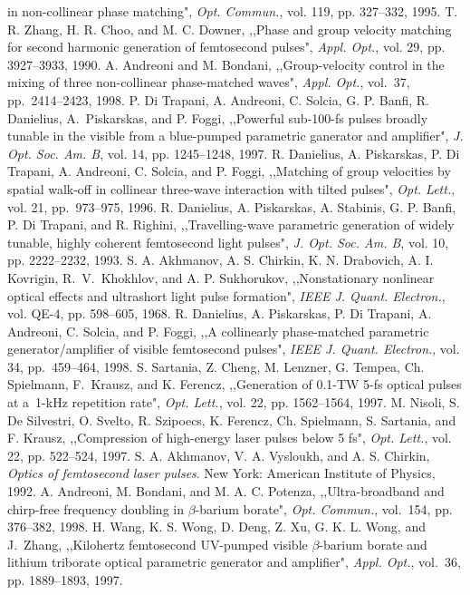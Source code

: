 \documentclass[times]{jtitauth}
\begin{document}
\begin{thebibliography}{99}
in non-collinear phase matching", {\it Opt. Commun.}, vol. 119,
pp. 327--332, 1995.
T. R. Zhang, H. R. Choo, and M. C. Downer, ,,Phase and group
velocity matching for second harmonic generation of femtosecond
pulses", {\it Appl. Opt.}, vol. 29, pp. 3927--3933, 1990.
A. Andreoni and M. Bondani, ,,Group-velocity control in the
\mbox{mixing} of three non-collinear phase-matched waves", {\it
Appl. Opt.}, vol.~37, \mbox{pp.~2414--2423,} 1998.
P. Di Trapani, A. Andreoni, C. Solcia, G. P. Banfi, R.
Danielius, A.~Piskarskas, and P. Foggi, ,,Powerful sub-100-fs
pulses broadly tunable in the visible from a blue-pumped
parametric ganerator and amplifier", {\it J. Opt. Soc. Am. B},
vol. 14, pp. 1245--1248, 1997.
R. Danielius, A. Piskarskas, P. Di Trapani, A. Andreoni,
C. Solcia, and P. Foggi, ,,Matching of group velocities by spatial
walk-off in collinear three-wave interaction with tilted pulses",
{\it Opt. Lett.}, vol. 21, \mbox{pp.~973--975,} 1996.
R. Danielius, A. Piskarskas, A. Stabinis, G. P. Banfi, P.
Di Trapani, and R. Righini, ,,Travelling-wave parametric
generation of widely tunable, highly coherent femtosecond light
pulses", {\it J. Opt. Soc. Am. B}, vol. 10, pp. 2222--2232, 1993.
S. A. Akhmanov, A. S. Chirkin, K. N. Drabovich, A. I.
Kovrigin, R.~V.~Khokhlov, and A. P. Sukhorukov, ,,Nonstationary
nonlinear optical effects and ultrashort light pulse formation",
{\it IEEE J. Quant. Ele\-ctron.}, vol. QE-4, pp. 598--605, 1968.
R. Danielius, A. Piskarskas, P. Di Trapani, A. Andreoni,
C. Solcia, and P. Foggi, ,,A collinearly phase-matched parametric
generator/amplifier of visible femtosecond pulses", {\it IEEE J.
Quant. Electron.}, vol. 34, \mbox{pp.~459--464,} 1998.
S. Sartania, Z. Cheng, M. Lenzner, G. Tempea, Ch.
Spielmann, F.~Krausz, and K. Ferencz, ,,Generation of 0.1-TW 5-fs
optical pulses at a~1-kHz repetition rate", {\it Opt. Lett.}, vol.
22, pp. 1562--1564, 1997.
M. Nisoli, S. De Silvestri, O. Svelto, R. Szipoecs, K.
Ferencz, Ch. Spielmann, S. Sartania, and F. Krausz, ,,Compression
of high-energy laser pulses below 5 fs", {\it Opt. Lett.}, vol.
22, pp. 522--524, 1997.
S. A. Akhmanov, V. A. Vysloukh, and A. S. Chirkin, {\it Optics of femtose\-cond laser
pulses}. New York: American Institute of Physics, 1992.
A. Andreoni, M. Bondani, and M. A. C. Potenza,
,,Ultra-broadband and chirp-free frequency doubling in
$\beta$-barium borate", {\it Opt. Commun.}, vol.~154, pp.
376--382, 1998.
H. Wang, K. S. Wong, D. Deng, Z. Xu, G. K. L. Wong, and
J.~Zhang, ,,Kilohertz femtosecond UV-pumped visible $\beta$-barium
borate and lithium triborate optical parametric generator and
amplifier", {\it Appl. Opt.}, vol.~36, pp. 1889--1893, 1997.
\end{thebibliography}
\end{document}
